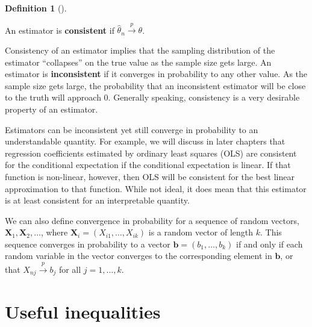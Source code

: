 \documentclass[
  letterpaper,
  DIV=11,
  numbers=noendperiod]{scrreprt}
\newcommand{\mb}{\symbf}
\newcommand{\X}{\mb{X}}
\newcommand{\inprob}{\overset{p}{\to}}
\theoremstyle{definition}
\theoremstyle{definition}
\newtheorem{definition}{Definition}[chapter]
\theoremstyle{plain}
\theoremstyle{remark}
\begin{document}
\begin{definition}[]\protect\hypertarget{def-consistency}{}\label{def-consistency}

An estimator is \textbf{consistent} if
\(\widehat{\theta}_n \inprob \theta\).

\end{definition}

Consistency of an estimator implies that the sampling distribution of
the estimator ``collapses'' on the true value as the sample size gets
large. An estimator is \textbf{inconsistent} if it converges in
probability to any other value. As the sample size gets large, the
probability that an inconsistent estimator will be close to the truth
will approach 0. Generally speaking, consistency is a very desirable
property of an estimator.

\begin{tcolorbox}[enhanced jigsaw, breakable, colback=white, left=2mm, colbacktitle=quarto-callout-note-color!10!white, rightrule=.15mm, toprule=.15mm, bottomtitle=1mm, toptitle=1mm, leftrule=.75mm, coltitle=black, arc=.35mm, title=\textcolor{quarto-callout-note-color}{\faInfo}\hspace{0.5em}{Note}, titlerule=0mm, colframe=quarto-callout-note-color-frame, bottomrule=.15mm, opacitybacktitle=0.6, opacityback=0]

Estimators can be inconsistent yet still converge in probability to an
understandable quantity. For example, we will discuss in later chapters
that regression coefficients estimated by ordinary least squares (OLS)
are consistent for the conditional expectation if the conditional
expectation is linear. If that function is non-linear, however, then OLS
will be consistent for the best linear approximation to that function.
While not ideal, it does mean that this estimator is at least consistent
for an interpretable quantity.

\end{tcolorbox}

We can also define convergence in probability for a sequence of random
vectors, \(\X_1, \X_2, \ldots\), where
\(\X_i = (X_{i1}, \ldots, X_{ik})\) is a random vector of length \(k\).
This sequence converges in probability to a vector
\(\mb{b} = (b_1, \ldots, b_k)\) if and only if each random variable in
the vector converges to the corresponding element in \(\mb{b}\), or that
\(X_{nj} \inprob b_j\) for all \(j = 1, \ldots, k\).

\hypertarget{useful-inequalities}{%
\section{Useful inequalities}\label{useful-inequalities}}
\end{document}
